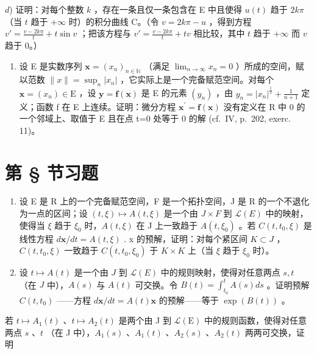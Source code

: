 \(d\)) 证明：对每个整数 \(k\) ，存在一条且仅一条包含在 E 中且使得 \(u(t)\) 趋于 \(2k\pi\) （当 \(t\) 趋于 \(+\infty\) 时）的积分曲线 C。（令 \(v = 2k\pi - u\) ，得到方程 \(v' = \frac{v - 2k\pi}{t} + t \sin v\) ；把该方程与 \(v' = \frac{v - 2k\pi}{t} + tv\) 相比较，其中 \(t\) 趋于 \(+\infty\) 而 \(v\) 趋于 0。）

\begin{enumerate}
\def\labelenumi{\arabic{enumi})}
\setcounter{enumi}{17}
\tightlist
\item
  设 E 是实数序列 \(\mathbf{x}=(x_{n})_{n\in\mathbb{N}}\) （满足 \(\lim_{n\to\infty}x_{n}=0\) ）所成的空间，赋以范数 \(\|x\|=\sup_{n}|x_{n}|\) ，它实际上是一个完备赋范空间。对每个 \(\mathbf{x}=(x_{n})\in\mathrm{E}\) ，设 \(\mathbf{y}=\mathbf{f}(\mathbf{x})\) 是 E 的元素 \((y_{n})\) ，由 \(y_{n}=|x_{n}|^{\frac{1}{2}}+\frac{1}{n+1}\) 定义；函数 f 在 E 上连续。证明：微分方程 \(\mathbf{x}^{\prime}=\mathbf{f}(\mathbf{x})\) 没有定义在 R 中 0 的一个邻域上、取值于 E 且在点 t=0 处等于 0 的解 (cf.~IV, p.~202, exerc. 11)。
\end{enumerate}

\setcounter{exercisegroup}{1}
\section*{第 \S{} 节习题}
{}

\begin{enumerate}
\def\labelenumi{\arabic{enumi})}
\item
  设 E 是 R 上的一个完备赋范空间，F 是一个拓扑空间，J 是 R 的一个不退化为一点的区间；设 \((t, \xi) \mapsto A(t, \xi)\) 是一个由 \(J \times F\) 到 \(\mathcal{L}(E)\) 中的映射，使得当 \(\xi\) 趋于 \(\xi_{0}\) 时，\(A(t, \xi)\) 在 J 上一致趋于 \(A(t, \xi_{0})\) 。若 \(C(t, t_{0}, \xi)\) 是线性方程 \(d\mathbf{x}/dt = A(t, \xi)\) . x 的预解，证明：对每个紧区间 \(K \subset J\) ，\(C(t, t_{0}, \xi)\) 一致趋于 \(C(t, t_{0}, \xi_{0})\) 于 \(K \times K\) 上（当 \(\xi\) 趋于 \(\xi_{0}\) 时）。
\item
  设 \(t \mapsto A(t)\) 是一个由 \(J\) 到 \(\mathcal{L}(E)\) 中的规则映射，使得对任意两点 \(s, t\) （在 \(J\) 中），\(A(s)\) 与 \(A(t)\) 可交换。令 \(B(t) = \int_{t_0}^{t} A(s) ds\) 。证明预解 \(C(t, t_0)\) ——方程 \(d\mathbf{x}/dt = A(t)\mathbf{x}\) 的预解——等于 \(\exp(B(t))\) 。
\end{enumerate}

若 \(t \mapsto A_1(t)\) 、\(t \mapsto A_2(t)\) 是两个由 J 到 \(\mathcal{L}(\mathrm{E})\) 中的规则函数，使得对任意两点 \(s\) 、\(t\) （在 J 中），\(A_1(s)\) 、\(A_1(t)\) 、\(A_2(s)\) 、\(A_2(t)\) 两两可交换，证明

